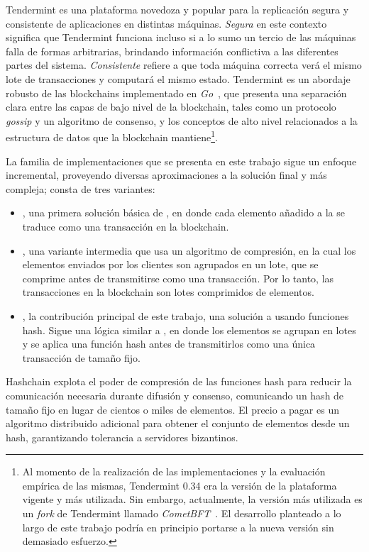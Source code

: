 Tendermint es una plataforma novedoza y popular para la
replicación segura y consistente de aplicaciones en distintas máquinas.
%
\textit{Segura} en este contexto significa que Tendermint funciona incluso si a lo sumo
un tercio de las máquinas falla de formas arbitrarias, brindando información conflictiva
a las diferentes partes del sistema.
%
\textit{Consistente} refiere a que toda máquina correcta verá el mismo lote de
transacciones y computará el mismo estado.
%
Tendermint es un abordaje robusto de las blockchains implementado
en \emph{Go}~\cite{donovan15go}, que presenta una separación clara entre las
capas de bajo nivel de la blockchain,
tales como un protocolo \textit{gossip} y un algoritmo de consenso, y los conceptos de alto
nivel relacionados a la estructura de datos que la blockchain mantiene\footnote{Al momento
de la realización de las implementaciones y la evaluación empírica de las mismas,
Tendermint 0.34 era la versión de la plataforma vigente y más utilizada. Sin embargo,
actualmente, la versión más utilizada es un \textit{fork} de Tendermint llamado \textit{CometBFT}~\cite{cometbft.repo}.
El desarrollo planteado a lo largo de este trabajo podría en principio portarse a la nueva versión sin demasiado esfuerzo.}.

%
%

La familia de implementaciones que se presenta en este trabajo
sigue un enfoque incremental, proveyendo diversas aproximaciones
a la solución final y más compleja; consta de tres variantes:
\begin{itemize}
  \item \textit{\vanilla}, una primera solución básica de \setchain, en donde cada elemento añadido
  a la \setchain se traduce como una transacción en la blockchain.
  \item \textit{\compresschain}, una variante intermedia que usa un algoritmo de compresión,
  en la cual los elementos enviados por los clientes son agrupados en un lote, que se comprime antes
  de transmitirse como una transacción. Por lo tanto, las transacciones en la blockchain son
  lotes comprimidos de elementos.
  \item \textit{\hashchain}, la contribución principal de este trabajo, una solución 
  a \setchain usando funciones hash. Sigue una lógica similar a \compresschain,
  en donde los elementos se agrupan en lotes y se aplica una función hash antes de transmitirlos
  como una única transacción de tamaño fijo.
\end{itemize}
%
Hashchain explota el poder de compresión de las funciones hash para reducir la
comunicación necesaria durante difusión y consenso, comunicando un hash de tamaño
fijo en lugar de cientos o miles de elementos.
%
El precio a pagar es un algoritmo distribuido adicional para obtener el conjunto de
elementos desde un hash, garantizando tolerancia a servidores bizantinos.
%

